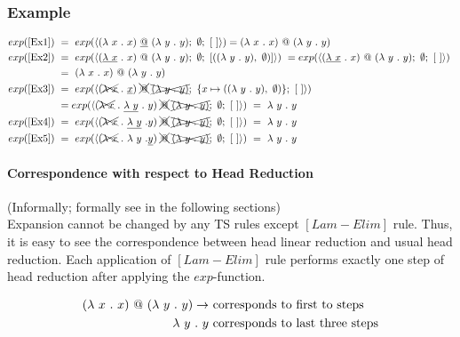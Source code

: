 \documentclass[a4paper, 10pt]{article}
\begin{document}
\subsubsection{Example}
\begin{align*}
  exp (\textnormal{\eqref{Ex1}})\ & =\  exp (\langle (\lambda \ x\ .\ x)\ \underline{@}\ (\lambda \ y\ .\  y);\ \emptyset;\ [\ ]
  \rangle) =  (\lambda \ x\ .\ x)\ @\ (\lambda \ y\ .\  y) \\
  exp (\textnormal{\eqref{Ex2}})\ & =\ exp ( \langle (\underline{\lambda \ x}\ .\ x)\ @\ (\lambda \ y\ .\  y);\ \emptyset;\
  [((\lambda\ y\ .\ y),\ \emptyset)] \rangle)\ =
  exp ( \langle (\underline{\lambda \ x}\ .\ x)\ @\ (\lambda \ y\ .\  y);\ \emptyset;\
  [\ ]  \rangle)\ \\ & = \ (\lambda \ x\ .\ x)\ @\ (\lambda \ y\ .\  y) \\
  exp (\textnormal{\eqref{Ex3}})\ & =\ exp ( \langle (\xcancel{\lambda \ x}\ .\ \underline{x})\ \xcancel{@}\
  \xcancel{(\lambda \ y\ .\  y)};\ \{x \mapsto ((\lambda\ y\ .\ y),\ \emptyset)\};\ [\ ] \rangle ) \\
  & =  exp ( \langle (\xcancel{\lambda \ x}\ .\ \underline{\lambda\ y}\ .\ y)\ \xcancel{@}\
  \xcancel{(\lambda \ y\ .\  y)};\ \emptyset;\ [\ ] \rangle )\ =\ \lambda\ y\ .\ y\\
  exp (\textnormal{\eqref{Ex4}})\ & =\ exp (\langle (\xcancel{\lambda \ x}\ .\ \underline{\lambda \ y}\ . y )\
  \xcancel{@}\ \xcancel{(\lambda \ y\ .\  y)};\ \emptyset; \ [\ ] \rangle)\ =\ \lambda \ y\ .\ y \\
  exp (\textnormal{\eqref{Ex5}})\ & =\ exp (\langle (\xcancel{\lambda \ x}\ .\ \lambda \ y\ . \underline{y} )\
  \xcancel{@}\ \xcancel{(\lambda \ y\ .\  y)};\ \emptyset; \ [\ ] \rangle) \ = \ \lambda \ y\ .\ y
\end{align*}

\paragraph{Correspondence with respect to Head Reduction} (Informally; formally see in the following sections) \\
Expansion cannot be changed by any TS rules except $[Lam-Elim]$ rule. Thus, 
it is easy to see the correspondence between head linear reduction and usual head
reduction. Each application of $[Lam-Elim]$ rule performs exactly one step of head
reduction after applying the $exp$-function.

\begin{align*}
  (\lambda \ x\ .\ x)\ @\ (\lambda \ y\ .\  y) \rightarrow &\ \textnormal{corresponds to first to steps} \\
  \lambda \ y\ .\ y  &\ \textnormal{corresponds to last three steps}
\end{align*}
\end{document}

